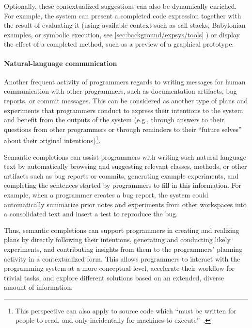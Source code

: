 Optionally, these contextualized suggestions can also be dynamically enriched.
For example, the system can present a completed code expression together with the result of evaluating it (using available context such as call stacks, Babylonian examples, or symbolic execution, see %
\cref{sec:background/expsys/tools}%
) or display the effect of a completed method, such as a preview of a graphical prototype.


\paragraph{Natural-language communication}
Another frequent activity of programmers regards to writing messages for human communication with other programmers, such as documentation artifacts, bug reports, or commit messages.
This can be considered as another type of plans and experiments that programmers conduct to express their intentions to the system and benefit from the outputs of the system (e.g., through answers to their questions from other programmers or through reminders to their ``future selves'' about their original intentions)\footnote{This perspective can also apply to source code which ``must be written for people to read,
and only incidentally for machines to execute''~\cite[p.~xxii]{abelson1996structure}.}.

Semantic completions can assist programmers with writing such natural language text by automatically browsing and suggesting relevant classes, methods, or other artifacts such as bug reports or commits, generating example experiments, and completing the sentences started by programmers to fill in this information.
For example, when a programmer creates a bug report, the system could automatically summarize prior notes and experiments from other workspaces into a consolidated text and insert a test to reproduce the bug.

\ParSep

Thus, semantic completions can support programmers in creating and realizing plans by directly following their intentions, generating and conducting likely experiments, and contributing insights from them to the programmers' planning activity in a contextualized form.
This allows programmers to interact with the programming system at a more conceptual level, accelerate their workflow for trivial tasks, and explore different solutions based on an extended, diverse amount of information.

